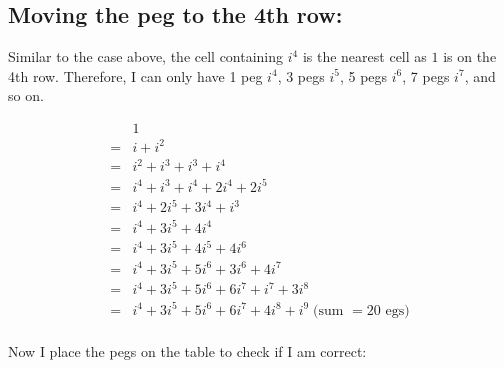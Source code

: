 \documentclass[12pt]{article}
\begin{document}
\vspace{1cm}

\subsection*{Moving the peg to the 4th row:}

\noindent Similar to the case above, the cell containing $i^4$ is the nearest cell as $1$ is on the 4th row. Therefore, I can only have 1 peg $i^4$, 3 pegs $i^5$, 5 pegs $i^6$, 7 pegs $i^7$, and so on.

\begin{align*}
    & 1 \\
    =& i + i^2 \\
    =& i^2+i^3 +i^3+i^4\\
    =& i^4+i^3+i^4+ 2i^4+ 2i^5\\
    =& i^4+ 2i^5+ 3i^4+ i^3\\
    =& i^4+ 3i^5+ 4i^4\\
    =& i^4+ 3i^5+ 4i^5+ 4i^6\\
    =& i^4+ 3i^5+ 5i^6+ 3i^6+ 4i^7\\    
    =& i^4+ 3i^5+ 5i^6+ 6i^7+ i^7+ 3i^8\\
    =& i^4+ 3i^5+ 5i^6+ 6i^7+ 4i^8+ i^9 \;\text{(sum $=20$ egs)}\\
\end{align*}

\noindent Now I place the pegs on the table to check if I am correct:
\end{document}
